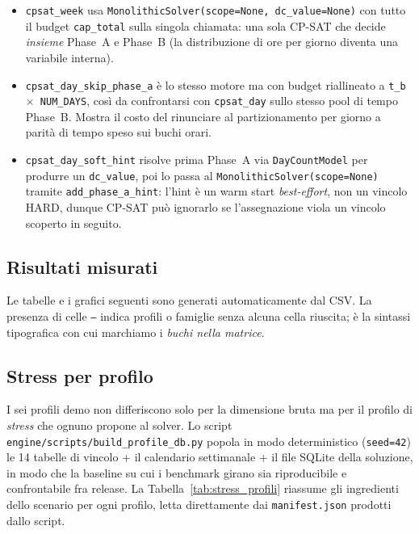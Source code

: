 \begin{itemize}
\item \texttt{cpsat\_week} usa
  \texttt{MonolithicSolver(scope=None, dc\_value=None)}
  con tutto il budget \texttt{cap\_total} sulla singola
  chiamata: una sola CP-SAT che decide \emph{insieme}
  Phase~A e Phase~B (la distribuzione di ore per giorno
  diventa una variabile interna).
\item \texttt{cpsat\_day\_skip\_phase\_a} \`e lo stesso
  motore ma con budget riallineato a
  \texttt{t\_b $\times$ NUM\_DAYS}, cos\`i da confrontarsi
  con \texttt{cpsat\_day} sullo stesso pool di tempo
  Phase~B. Mostra il costo del rinunciare al partizionamento
  per giorno a parit\`a di tempo speso sui buchi orari.
\item \texttt{cpsat\_day\_soft\_hint} risolve prima Phase~A
  via \texttt{DayCountModel} per produrre un
  \texttt{dc\_value}, poi lo passa al
  \texttt{MonolithicSolver(scope=None)} tramite
  \texttt{add\_phase\_a\_hint}: l'hint \`e un warm start
  \emph{best-effort}, non un vincolo HARD, dunque CP-SAT
  pu\`o ignorarlo se l'assegnazione viola un vincolo
  scoperto in seguito.
\end{itemize}

\subsection{Risultati misurati}

Le tabelle e i grafici seguenti sono generati
automaticamente dal CSV. La presenza di celle \texttt{--}
indica profili o famiglie senza alcuna cella riuscita; \`e
la sintassi tipografica con cui marchiamo i \emph{buchi
nella matrice}.



\subsection{Stress per profilo}
\label{sec:stress_per_profilo}

I sei profili demo non differiscono solo per la dimensione bruta
ma per il profilo di \emph{stress} che ognuno propone al solver.
Lo script \texttt{engine/scripts/build\_profile\_db.py} popola in
modo deterministico (\texttt{seed=42}) le 14 tabelle di vincolo +
il calendario settimanale + il file SQLite della soluzione, in
modo che la baseline su cui i benchmark girano sia riproducibile
e confrontabile fra release. La Tabella~\ref{tab:stress_profili}
riassume gli ingredienti dello scenario per ogni profilo, letta
direttamente dai \texttt{manifest.json} prodotti dallo script.

